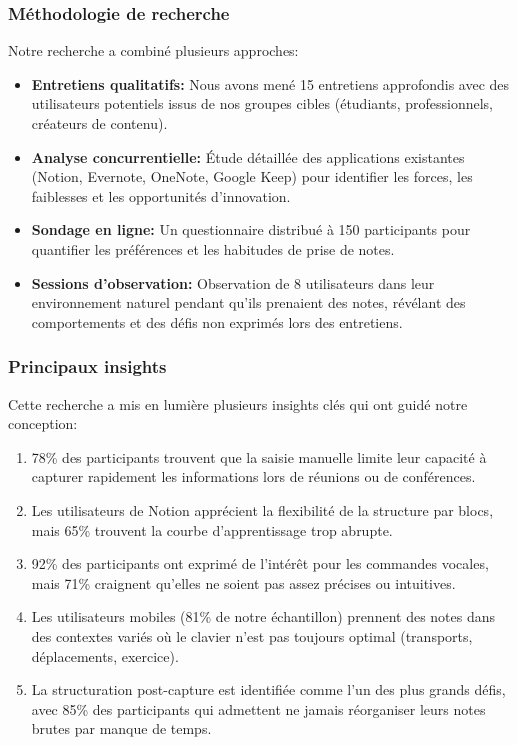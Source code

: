 \subsubsection{Méthodologie de recherche}

Notre recherche a combiné plusieurs approches:

\begin{itemize}
    \item \textbf{Entretiens qualitatifs:} Nous avons mené 15 entretiens approfondis avec des utilisateurs potentiels issus de nos groupes cibles (étudiants, professionnels, créateurs de contenu).
    
    \item \textbf{Analyse concurrentielle:} Étude détaillée des applications existantes (Notion, Evernote, OneNote, Google Keep) pour identifier les forces, les faiblesses et les opportunités d'innovation.
    
    \item \textbf{Sondage en ligne:} Un questionnaire distribué à 150 participants pour quantifier les préférences et les habitudes de prise de notes.
    
    \item \textbf{Sessions d'observation:} Observation de 8 utilisateurs dans leur environnement naturel pendant qu'ils prenaient des notes, révélant des comportements et des défis non exprimés lors des entretiens.
\end{itemize}

\subsubsection{Principaux insights}

Cette recherche a mis en lumière plusieurs insights clés qui ont guidé notre conception:

\begin{enumerate}
    \item 78\% des participants trouvent que la saisie manuelle limite leur capacité à capturer rapidement les informations lors de réunions ou de conférences.
    
    \item Les utilisateurs de Notion apprécient la flexibilité de la structure par blocs, mais 65\% trouvent la courbe d'apprentissage trop abrupte.
    
    \item 92\% des participants ont exprimé de l'intérêt pour les commandes vocales, mais 71\% craignent qu'elles ne soient pas assez précises ou intuitives.
    
    \item Les utilisateurs mobiles (81\% de notre échantillon) prennent des notes dans des contextes variés où le clavier n'est pas toujours optimal (transports, déplacements, exercice).
    
    \item La structuration post-capture est identifiée comme l'un des plus grands défis, avec 85\% des participants qui admettent ne jamais réorganiser leurs notes brutes par manque de temps.
\end{enumerate}

